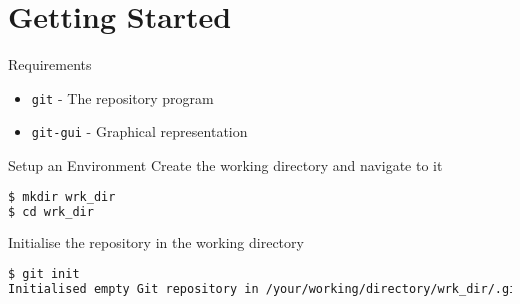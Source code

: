 \documentclass{beamer}
\begin{document}
  \section{Getting Started}
  \begin{frame}{Requirements}
    \begin{itemize}
      \item \texttt{git} - The repository program
      \item \texttt{git-gui} - Graphical representation
    \end{itemize}
  \end{frame}
  \begin{frame}[fragile=singleslide]{Setup an Environment}
    Create the working directory and navigate to it
    \begin{lstlisting}[language=bash]
$ mkdir wrk_dir
$ cd wrk_dir
    \end{lstlisting}
    Initialise the repository in the working directory
    \begin{lstlisting}[language=bash]
$ git init
Initialised empty Git repository in /your/working/directory/wrk_dir/.git/
    \end{lstlisting}
  \end{frame}
\end{document}
